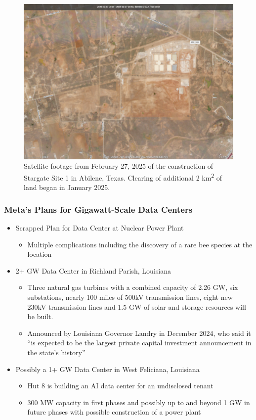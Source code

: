 \documentclass[aspectratio=169]{beamer}
\begin{document}
    \begin{frame}
        \begin{figure}
            \includegraphics[height=0.5\textwidth]{images/stargate-1-copernicus-feb-2025}
            \caption{Satellite footage from February 27, 2025 of the construction of Stargate Site 1 in Abilene, Texas. Clearing of additional 2 km\textsuperscript{2} of land began in January 2025.~\parencite{copernicus_browser_2025}}
        \end{figure}
    \end{frame}
    \begin{frame}
        \frametitle{Meta's Plans for Gigawatt-Scale Data Centers}
        \begin{itemize}
            \item Scrapped Plan for Data Center at Nuclear Power Plant~\parencite{murphy_criddle_2024}
            \begin{itemize}
                \item Multiple complications including the discovery of a rare bee species at the location
            \end{itemize}
            \item 2+ GW Data Center in Richland Parish, Louisiana~\parencite{zuckerberg_louisiana_datacenter_2024}
            \begin{itemize}
                \item Three natural gas turbines with a combined capacity of 2.26 GW, six substations, nearly 100 miles of 500kV transmission lines, eight new 230kV transmission lines and 1.5 GW of solar and storage resources will be built.~\parencite{entergy_2025}
                \item Announced by Louisiana Governor Landry in December 2024, who said it ``is expected to be the largest private capital investment announcement in the state’s history''~\parencite{governor_of_louisiana_2024}
            \end{itemize}
            \item Possibly a 1+ GW Data Center in West Feliciana, Louisiana~\parencite{boone_2025}
            \begin{itemize}
                \item Hut 8 is building an AI data center for an undisclosed tenant
                \item 300 MW capacity in first phases and possibly up to and beyond 1 GW in future phases with possible construction of a power plant
            \end{itemize}
        \end{itemize}
    \end{frame}
\end{document}
